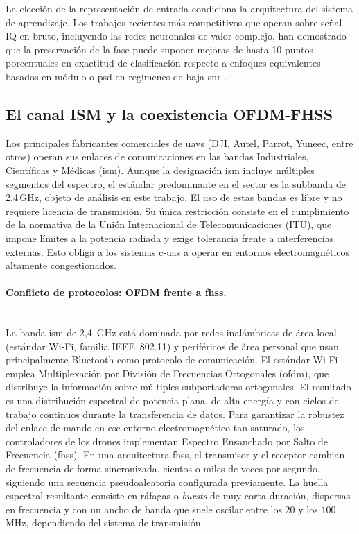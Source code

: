 La elección de la representación de entrada condiciona la arquitectura del sistema de aprendizaje. Los trabajos recientes más competitivos que operan sobre señal IQ en bruto, incluyendo las redes neuronales de valor complejo, han demostrado que la preservación de la fase puede suponer mejoras de hasta 10 puntos porcentuales en exactitud de clasificación respecto a enfoques equivalentes basados en módulo o \gls{psd} en regímenes de baja \gls{snr} \cite{alam_rf-enabled_2023}.

\subsection{El canal ISM y la coexistencia OFDM-FHSS}
\label{subsec:canal_ism}

Los principales fabricantes comerciales de \glspl{uav} (DJI, Autel, Parrot, Yuneec, entre otros) operan sus enlaces de comunicaciones en las bandas Industriales, Científicas y Médicas (\gls{ism}). Aunque la designación \gls{ism} incluye múltiples segmentos del espectro, el estándar predominante en el sector es la subbanda de 2,4\,GHz, objeto de análisis en este trabajo. El uso de estas bandas es libre y no requiere licencia de transmisión. Su única restricción consiste en el cumplimiento de la normativa de la Unión Internacional de Telecomunicaciones (ITU), que impone límites a la potencia radiada y exige tolerancia frente a interferencias externas. Esto obliga a los sistemas \gls{c-uas} a operar en entornos electromagnéticos altamente congestionados.

\paragraph{Conflicto de protocolos: OFDM frente a \gls{fhss}.}\mbox{}\\[0.5em] La banda \gls{ism} de 2,4~GHz está dominada por redes inalámbricas de área local (estándar Wi-Fi, familia IEEE~802.11) y periféricos de área personal que usan principalmente Bluetooth como protocolo de comunicación. El estándar Wi-Fi emplea Multiplexación por División de Frecuencias Ortogonales (\gls{ofdm}), que distribuye la información sobre múltiples subportadoras ortogonales. El resultado es una distribución espectral de potencia plana, de alta energía y con ciclos de trabajo continuos durante la transferencia de datos. Para garantizar la robustez del enlace de mando en ese entorno electromagnético tan saturado, los controladores de los drones implementan Espectro Ensanchado por Salto de Frecuencia (\gls{fhss}). En una arquitectura \gls{fhss}, el transmisor y el receptor cambian de frecuencia de forma sincronizada, cientos o miles de veces por segundo, siguiendo una secuencia pseudoaleatoria configurada previamente. La huella espectral resultante consiste en ráfagas o \textit{bursts} de muy corta duración, dispersas en frecuencia y con un ancho de banda que suele oscilar entre los $20$ y los $100$\,MHz, dependiendo del sistema de transmisión. 

